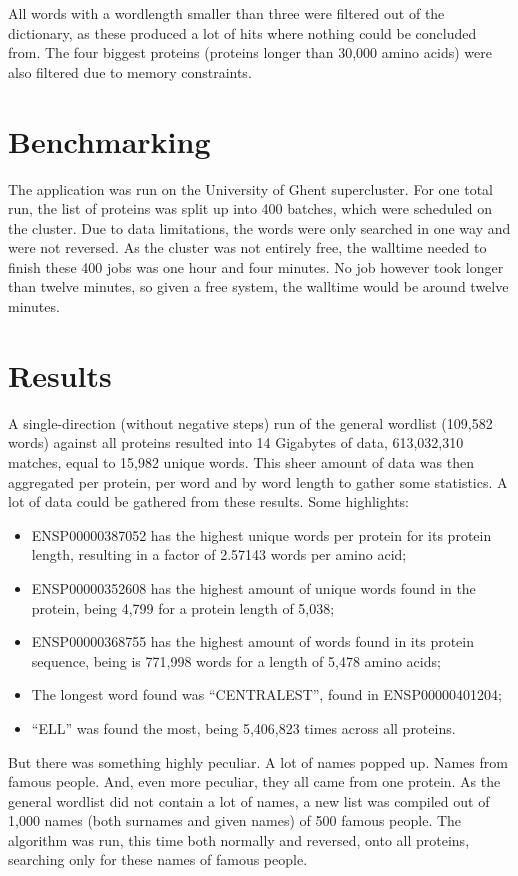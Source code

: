 \documentclass{bioinfo}
\begin{document}
All words with a wordlength smaller than three were filtered out of the dictionary, as these produced a lot of hits where nothing could be concluded from. The four biggest proteins (proteins longer than 30,000 amino acids) were also filtered due to memory constraints.

\section{Benchmarking}
The application was run on the University of Ghent \cite{HPCUGent} supercluster. For one total run, the list of proteins was split up into 400 batches, which were scheduled on the cluster. Due to data limitations, the words were only searched in one way and were not reversed. As the cluster was not entirely free, the walltime needed to finish these 400 jobs was one hour and four minutes. No job however took longer than twelve minutes, so given a free system, the walltime would be around twelve minutes.

\section{Results}
A single-direction (without negative steps) run of the general wordlist (109,582 words) against all proteins resulted into 14 Gigabytes of data, 613,032,310 matches, equal to 15,982 unique words. This sheer amount of data was then aggregated per protein, per word and by word length to gather some statistics. A lot of data could be gathered from these results. Some highlights:
\begin{itemize}
\item ENSP00000387052 has the highest unique words per protein for its protein length, resulting in a factor of 2.57143 words per amino acid;
\item ENSP00000352608 has the highest amount of unique words found in the protein, being 4,799 for a protein length of 5,038;
\item ENSP00000368755 has the highest amount of words found in its protein sequence, being is 771,998 words for a length of 5,478 amino acids;
\item The longest word found was ``CENTRALEST'', found in ENSP00000401204;
\item ``ELL'' was found the most, being 5,406,823 times across all proteins.
\end{itemize}

But there was something highly peculiar. A lot of names popped up. Names from famous people. And, even more peculiar, they all came from one protein. As the general wordlist did not contain a lot of names, a new list was compiled out of 1,000 names (both surnames and given names) of 500 famous people. The algorithm was run, this time both normally and reversed, onto all proteins, searching only for these names of famous people. 
\end{document}
